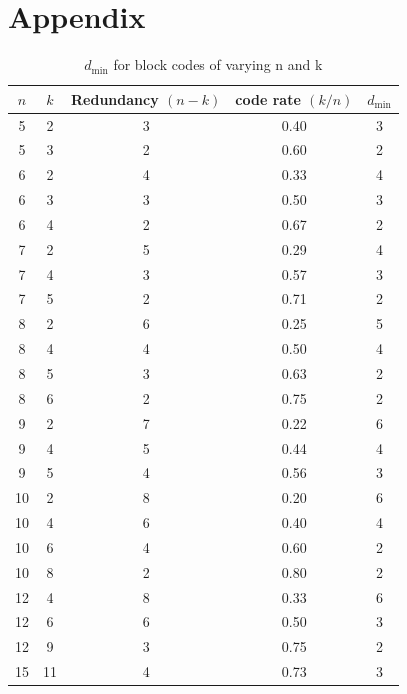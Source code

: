 \documentclass{article}
\begin{document}
\section{Appendix}
\begin{table}[ht]
  \centering
  \begin{tabular}{ccccc}
    \hline
    \(n\)  &  \(k\)  &  Redundancy \((n - k)\)  & code rate \((k/n)\) & \(d_\text{min}\)\\
    \hline
         5  &   2  &  3  &  0.40  &  3 \\
         5  &   3  &  2  &  0.60  &  2 \\
         6  &   2  &  4  &  0.33  &  4 \\
         6  &   3  &  3  &  0.50  &  3 \\
         6  &   4  &  2  &  0.67  &  2 \\
         7  &   2  &  5  &  0.29  &  4 \\
         7  &   4  &  3  &  0.57  &  3 \\
         7  &   5  &  2  &  0.71  &  2 \\
         8  &   2  &  6  &  0.25  &  5 \\
         8  &   4  &  4  &  0.50  &  4 \\
         8  &   5  &  3  &  0.63  &  2 \\
         8  &   6  &  2  &  0.75  &  2 \\
         9  &   2  &  7  &  0.22  &  6 \\
         9  &   4  &  5  &  0.44  &  4 \\
         9  &   5  &  4  &  0.56  &  3 \\
        10  &   2  &  8  &  0.20  &  6 \\
        10  &   4  &  6  &  0.40  &  4 \\
        10  &   6  &  4  &  0.60  &  2 \\
        10  &   8  &  2  &  0.80  &  2 \\
        12  &   4  &  8  &  0.33  &  6 \\
        12  &   6  &  6  &  0.50  &  3 \\
        12  &   9  &  3  &  0.75  &  2 \\
        15  &  11  &  4  &  0.73  &  3 \\
    \hline
  \end{tabular}
  \caption{\(d_\text{min}\) for block codes of varying n and k \cite{jaish2026}}
  \label{tab:emperical_investigation}
\end{table}
\end{document}
